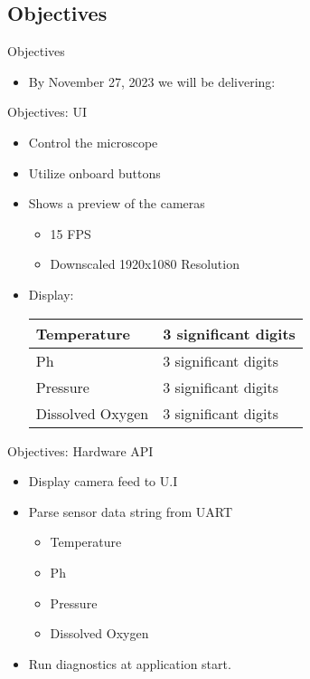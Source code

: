 \documentclass[14pt, aspectratio=169]{beamer}
\begin{document}
\subsection{Objectives}
\begin{frame}{Objectives}
	\begin{itemize}
		\item By November 27, 2023 we will be delivering:
	\end{itemize}
\end{frame}
\begin{frame}{Objectives: UI}
	\begin{itemize}
		\item Control the microscope
		\item Utilize onboard buttons
		\item Shows a preview of the cameras
		      \begin{itemize}
			      \item 15 FPS
			      \item Downscaled 1920x1080 Resolution
		      \end{itemize}
		\item Display:
		      \begin{table}[h!]
			      \begin{tabular}{|l|l|}
				      \hline
				      Temperature      & 3 significant digits \\ \hline
				      Ph               & 3 significant digits \\ \hline
				      Pressure         & 3 significant digits \\ \hline
				      Dissolved Oxygen & 3 significant digits \\ \hline
			      \end{tabular}
		      \end{table}
	\end{itemize}
\end{frame}
\begin{frame}{Objectives: Hardware API}
	\begin{itemize}
		\item Display camera feed to U.I
		\item Parse sensor data string from UART
		      \begin{itemize}
			      \item Temperature
			      \item Ph
			      \item Pressure
			      \item Dissolved Oxygen
		      \end{itemize}
		\item Run diagnostics at application start.
	\end{itemize}
\end{frame}
\end{document}
